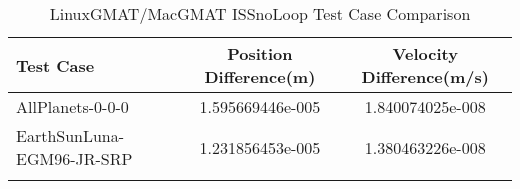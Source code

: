 \begin{table}[htbp!]
\centering
\caption{ LinuxGMAT/MacGMAT ISSnoLoop Test Case Comparison}
      \begin{tabular}{lcc}
      \hline\hline
          Test Case & Position Difference(m) & Velocity Difference(m/s) \\
         \hline
         AllPlanets-0-0-0 & 1.595669446e-005 & 1.840074025e-008 \\
         EarthSunLuna-EGM96-JR-SRP & 1.231856453e-005 & 1.380463226e-008 \\
      \hline\hline
      \label{Table: ISSnoLoop LinuxGMAT-MacGMAT Table} 
\end{tabular}
\end{table}
